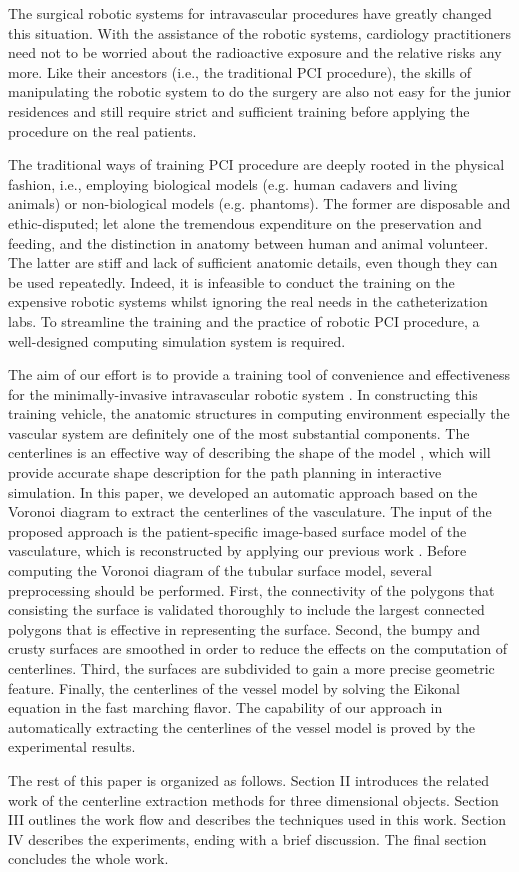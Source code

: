 The surgical robotic systems for intravascular procedures have greatly changed this situation.
With the assistance of the robotic systems, cardiology practitioners need not to be worried about the radioactive exposure and the relative risks any more.
Like their ancestors (i.e., the traditional PCI procedure), the skills of manipulating the robotic system to do the surgery are also not easy for the junior residences and still require strict and sufficient training before applying the procedure on the real patients. %

The traditional ways of training PCI procedure are deeply rooted in the physical fashion, i.e., employing biological models (e.g. human cadavers and living animals) or non-biological models (e.g. phantoms). %
The former are disposable and ethic-disputed; let alone the tremendous expenditure on the preservation and feeding, and the distinction in anatomy between human and animal volunteer. %
The latter are stiff and lack of sufficient anatomic details, even though they can be used repeatedly.
Indeed, it is infeasible to conduct the training on the expensive robotic systems whilst ignoring the real needs in the catheterization labs.
To streamline the training and the practice of robotic PCI procedure, a well-designed computing simulation system is required.

The aim of our effort is to provide a training tool of convenience and effectiveness for the minimally-invasive intravascular robotic system \cite{Ji2011EMBC}.
In constructing this training vehicle, the anatomic structures in computing environment especially the vascular system are definitely one of the most substantial components.
The centerlines is an effective way of describing the shape of the model \cite{Ogniewicz1995}, which will provide accurate shape description for the path planning in interactive simulation.
In this paper, we developed an automatic approach based on the Voronoi diagram \cite{Antiga2003} to extract the centerlines of the vasculature.
The input of the proposed approach is the patient-specific image-based surface model of the vasculature, which is reconstructed by applying our previous work \cite{Yang2014ICRA}. %
Before computing the Voronoi diagram of the tubular surface model, several preprocessing should be performed.
First, the connectivity of the polygons that consisting the surface is validated thoroughly to include the largest connected polygons that is effective in representing the surface. %
Second, the bumpy and crusty surfaces are smoothed in order to reduce the effects on the computation of centerlines.
Third, the surfaces are subdivided to gain a more precise geometric feature.
Finally, the centerlines of the vessel model by solving the Eikonal equation in the fast marching flavor.
The capability of our approach in automatically extracting the centerlines of the vessel model is proved by the experimental results.

The rest of this paper is organized as follows.
Section II introduces the related work of the centerline extraction methods for three dimensional objects.
Section III outlines the work flow and describes the techniques used in this work.
Section IV describes the experiments, ending with a brief discussion.
The final section concludes the whole work. 